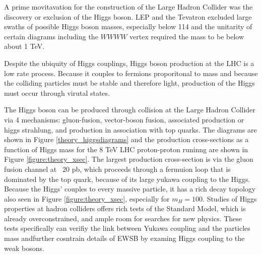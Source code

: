 %

%
A prime movitavation for the construction of the Large Hadron Collider was the 
discovery or exclusion of the Higgs boson. LEP and the Tevatron excluded
large swaths of possible Higgs boson masses, especially below 114 \gevcc and
the unitarity of certain diagrams including the $WWWW$ vertex required the 
mass to be below about 1 TeV. 

Despite the ubiquity of Higgs couplings, Higgs boson production at the LHC is a low
rate process. Because it couples to fermions proporitonal to mass and because
the colliding particles must be stable and therefore light, production of the Higgs must occur
through virutal states. 

The Higgs boson can be produced through collision at the Large Hadron Collider via 4 mechanisms: gluon-fusion, 
vector-boson fusion, associated production or higgs strahlung, and production in association with 
top quarks. The diagrams are shown in Figure \ref{theory_higgsdiagrams} and the production cross-sections as a function of Higgs mass for
the 8 TeV LHC proton-proton runinng are shown in Figure \ref{figure:theory_xsec}. The largest production cross-section is via the gluon fusion channel at ~$20$ pb,
which proceeds through a fermuion loop that is dominated by the top quark, because of its large yukawa coupling to the Higgs. Because
the Higgs' couples to every massive particle, it has a rich decay topology also seen in Figure \ref{figure:theory_xsec}, especially for $m_H=100$.
Studies of Higgs properties at hadron colliders offers rich tests of the Standard Model, which is already overconstrained, and ample room
for searches for new physics. These tests specifically can verifiy the link between Yukawa coupling and the particles mass andfurther 
cosntrain details of EWSB by examing Higgs coupling to the weak bosons. 


